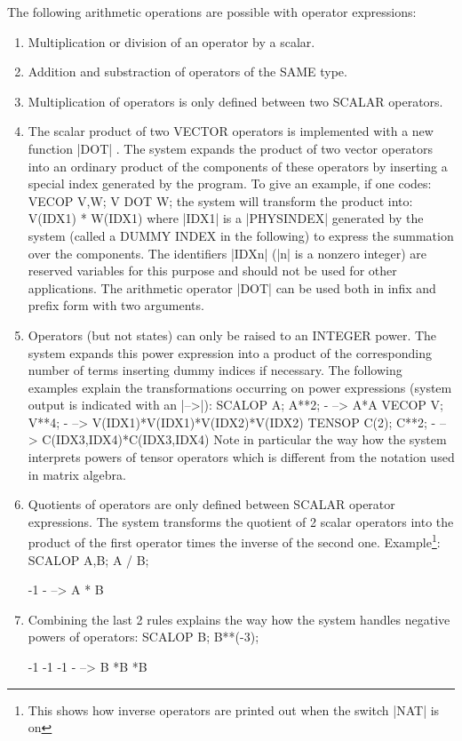The following arithmetic operations are possible with
operator expressions:
\begin{enumerate}
\item Multiplication or division of an operator by a scalar.
\item Addition and substraction of operators of the SAME type.
\item Multiplication of operators is only defined between two
SCALAR operators.
\item The scalar product of two VECTOR operators is implemented
      with a new function |DOT| . The system expands
the product of
two vector operators into an ordinary product of the components of these
operators by inserting a special index generated by the program.
To give an example, if one codes:
\begintt
VECOP V,W;
V DOT W;
\endtt
the system will transform the product into:
\begintt
V(IDX1) * W(IDX1)
\endtt
where |IDX1| is a |PHYSINDEX| generated by the system (called a DUMMY
INDEX in the following) to express the summation over the components.
The identifiers |IDXn| (|n| is
a nonzero integer) are
reserved variables for this purpose and should not be used for other
applications. The arithmetic operator
|DOT| can be used both in infix and prefix form with two arguments.

\item Operators (but not states) can only be raised to an INTEGER power.
The system expands this power expression
into a product of the corresponding number of terms
inserting dummy indices if necessary. The following examples explain
the transformations occurring on power expressions (system output
is indicated with an |-->|):
\begintt
SCALOP A; A**2;
- --> A*A
VECOP V; V**4;
- --> V(IDX1)*V(IDX1)*V(IDX2)*V(IDX2)
TENSOP C(2); C**2;
- --> C(IDX3,IDX4)*C(IDX3,IDX4)
\endtt
Note in particular the way how the system interprets powers of
tensor operators which is different from the notation used in matrix
algebra.

\item Quotients of operators are only defined between SCALAR operator
expressions.
The system transforms the quotient of 2 scalar operators into the
product of the first operator times the inverse of the second one.
Example\footnote{This shows how inverse operators are printed out when
the switch |NAT| is on}:
\begintt
SCALOP A,B;   A / B;

         -1
- --> A * B
\endtt

\item Combining the  last 2 rules explains the way how the system
handles negative powers of operators:
\begintt
SCALOP B;
B**(-3);

      -1   -1   -1
- --> B   *B   *B
\endtt

\end{enumerate}

